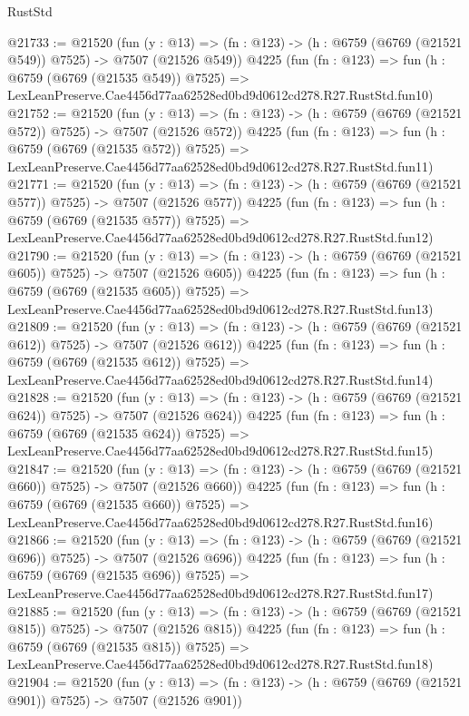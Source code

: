 \begin{lexlean}{RustStd}
\begin{coremodule}
@21733 := @21520
    (fun (y : @13) => (fn : @123) -> (h : @6759 (@6769 (@21521 @549)) @7525) -> @7507 (@21526 @549))
    @4225
    (fun (fn : @123) =>
    fun (h : @6759 (@6769 (@21535 @549)) @7525) =>
    LexLeanPreserve.Cae4456d77aa62528ed0bd9d0612cd278.R27.RustStd.fun10)
@21752 := @21520
    (fun (y : @13) => (fn : @123) -> (h : @6759 (@6769 (@21521 @572)) @7525) -> @7507 (@21526 @572))
    @4225
    (fun (fn : @123) =>
    fun (h : @6759 (@6769 (@21535 @572)) @7525) =>
    LexLeanPreserve.Cae4456d77aa62528ed0bd9d0612cd278.R27.RustStd.fun11)
@21771 := @21520
    (fun (y : @13) => (fn : @123) -> (h : @6759 (@6769 (@21521 @577)) @7525) -> @7507 (@21526 @577))
    @4225
    (fun (fn : @123) =>
    fun (h : @6759 (@6769 (@21535 @577)) @7525) =>
    LexLeanPreserve.Cae4456d77aa62528ed0bd9d0612cd278.R27.RustStd.fun12)
@21790 := @21520
    (fun (y : @13) => (fn : @123) -> (h : @6759 (@6769 (@21521 @605)) @7525) -> @7507 (@21526 @605))
    @4225
    (fun (fn : @123) =>
    fun (h : @6759 (@6769 (@21535 @605)) @7525) =>
    LexLeanPreserve.Cae4456d77aa62528ed0bd9d0612cd278.R27.RustStd.fun13)
@21809 := @21520
    (fun (y : @13) => (fn : @123) -> (h : @6759 (@6769 (@21521 @612)) @7525) -> @7507 (@21526 @612))
    @4225
    (fun (fn : @123) =>
    fun (h : @6759 (@6769 (@21535 @612)) @7525) =>
    LexLeanPreserve.Cae4456d77aa62528ed0bd9d0612cd278.R27.RustStd.fun14)
@21828 := @21520
    (fun (y : @13) => (fn : @123) -> (h : @6759 (@6769 (@21521 @624)) @7525) -> @7507 (@21526 @624))
    @4225
    (fun (fn : @123) =>
    fun (h : @6759 (@6769 (@21535 @624)) @7525) =>
    LexLeanPreserve.Cae4456d77aa62528ed0bd9d0612cd278.R27.RustStd.fun15)
@21847 := @21520
    (fun (y : @13) => (fn : @123) -> (h : @6759 (@6769 (@21521 @660)) @7525) -> @7507 (@21526 @660))
    @4225
    (fun (fn : @123) =>
    fun (h : @6759 (@6769 (@21535 @660)) @7525) =>
    LexLeanPreserve.Cae4456d77aa62528ed0bd9d0612cd278.R27.RustStd.fun16)
@21866 := @21520
    (fun (y : @13) => (fn : @123) -> (h : @6759 (@6769 (@21521 @696)) @7525) -> @7507 (@21526 @696))
    @4225
    (fun (fn : @123) =>
    fun (h : @6759 (@6769 (@21535 @696)) @7525) =>
    LexLeanPreserve.Cae4456d77aa62528ed0bd9d0612cd278.R27.RustStd.fun17)
@21885 := @21520
    (fun (y : @13) => (fn : @123) -> (h : @6759 (@6769 (@21521 @815)) @7525) -> @7507 (@21526 @815))
    @4225
    (fun (fn : @123) =>
    fun (h : @6759 (@6769 (@21535 @815)) @7525) =>
    LexLeanPreserve.Cae4456d77aa62528ed0bd9d0612cd278.R27.RustStd.fun18)
@21904 := @21520
    (fun (y : @13) => (fn : @123) -> (h : @6759 (@6769 (@21521 @901)) @7525) -> @7507 (@21526 @901))

\end{coremodule}
\end{lexlean}
